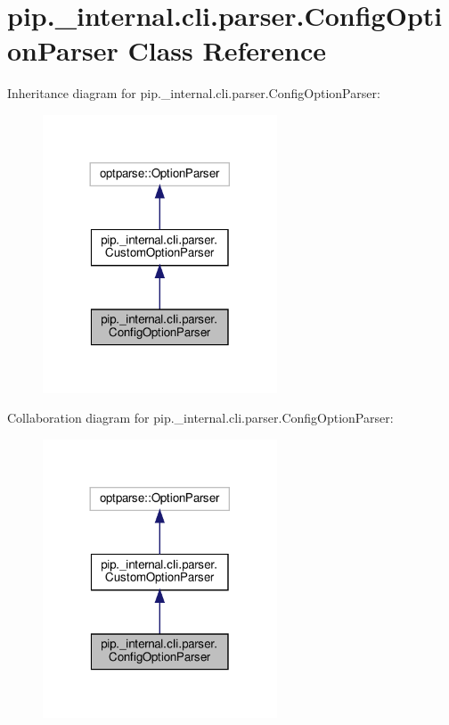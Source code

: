 \hypertarget{classpip_1_1__internal_1_1cli_1_1parser_1_1ConfigOptionParser}{}\section{pip.\+\_\+internal.\+cli.\+parser.\+Config\+Option\+Parser Class Reference}
\label{classpip_1_1__internal_1_1cli_1_1parser_1_1ConfigOptionParser}


Inheritance diagram for pip.\+\_\+internal.\+cli.\+parser.\+Config\+Option\+Parser\+:
\nopagebreak
\begin{figure}[H]
\begin{center}
\leavevmode
\includegraphics[width=197pt]{classpip_1_1__internal_1_1cli_1_1parser_1_1ConfigOptionParser__inherit__graph}
\end{center}
\end{figure}


Collaboration diagram for pip.\+\_\+internal.\+cli.\+parser.\+Config\+Option\+Parser\+:
\nopagebreak
\begin{figure}[H]
\begin{center}
\leavevmode
\includegraphics[width=197pt]{classpip_1_1__internal_1_1cli_1_1parser_1_1ConfigOptionParser__coll__graph}
\end{center}
\end{figure}
